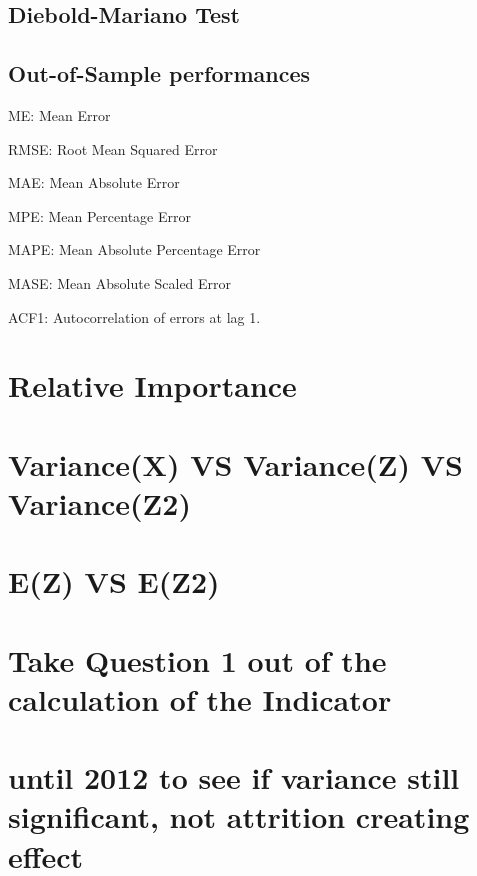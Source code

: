 \documentclass[12pt,a4paper,oneside]{book}
\begin{document}
\subsection{Diebold-Mariano Test}



\subsection{Out-of-Sample performances}


ME: Mean Error

RMSE: Root Mean Squared Error

MAE: Mean Absolute Error

MPE: Mean Percentage Error

MAPE: Mean Absolute Percentage Error

MASE: Mean Absolute Scaled Error

ACF1: Autocorrelation of errors at lag 1.

\section{Relative Importance}







\section{Variance(X) VS Variance(Z) VS Variance(Z2)}

\section{E(Z) VS E(Z2)}


\section{Take Question 1 out of the calculation of the Indicator}

\section{until 2012 to see if variance still significant, not attrition creating effect}
\end{document}
